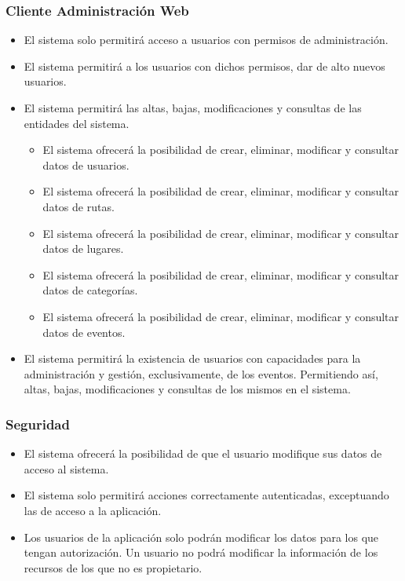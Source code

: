 \subsubsection*{Cliente Administración Web}
\begin{itemize}
\setlength\itemsep{1pt}
\item El sistema solo permitirá acceso a usuarios con permisos de administración.
\item El sistema permitirá a los usuarios con dichos permisos, dar de alto nuevos usuarios.
\item El sistema permitirá las altas, bajas, modificaciones y consultas de las entidades del sistema.
	\begin{itemize}
	\item El sistema ofrecerá la posibilidad de crear, eliminar, modificar y consultar datos de usuarios.
	\item El sistema ofrecerá la posibilidad de crear, eliminar, modificar y consultar datos de rutas.
	\item El sistema ofrecerá la posibilidad de crear, eliminar, modificar y consultar datos de lugares.
	\item El sistema ofrecerá la posibilidad de crear, eliminar, modificar y consultar datos de categorías.
	\item El sistema ofrecerá la posibilidad de crear, eliminar, modificar y consultar datos de eventos.
	\end{itemize}
\item El sistema permitirá la existencia de usuarios con capacidades para la administración y gestión, exclusivamente, de los eventos. Permitiendo así, altas, bajas, modificaciones y consultas de los mismos en el sistema.
\end{itemize}

\subsubsection*{Seguridad}
\begin{itemize}
\setlength\itemsep{1pt}
\item El sistema ofrecerá la posibilidad de que el usuario modifique sus datos de acceso al sistema.
\item El sistema solo permitirá acciones correctamente autenticadas, exceptuando las de acceso a la aplicación.
\item Los usuarios de la aplicación solo podrán modificar los datos para los que tengan autorización. Un usuario no podrá modificar la información de los recursos de los que no es propietario.
\end{itemize}


